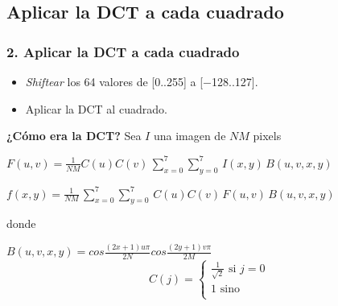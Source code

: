 \documentclass{beamer}
\begin{document}
\subsection{Aplicar la DCT a cada cuadrado}
\begin{frame}
    \frametitle{2. Aplicar la DCT a cada cuadrado}
    \begin{itemize}
        \item \textit{Shiftear} los 64 valores de [0..255] a [$-$128..127].
        \item Aplicar la DCT al cuadrado.
    \end{itemize}

\end{frame}

\begin{frame}
    \begin{center}
        \textbf{¿Cómo era la DCT?} Sea $I$ una imagen de $NM$ pixels
        \vspace{1cm}

        $F(u,v)=\frac{1}{NM}C(u)C(v)\,\sum_{x=0}^{7} \sum_{y=0}^{7}\,I(x,y)\,B(u,v,x,y)$

        \vspace{3mm}
        $f(x,y)=\frac{1}{NM}\,\sum_{x=0}^{7} \sum_{y=0}^{7}\,C(u)C(v)\,F(u,v)\,B(u,v,x,y)$

        \vspace{3mm}
        donde
        \vspace{3mm}

        $B(u,v,x,y) = cos\frac{(2x+1)u\pi}{2N}cos\frac{(2y+1)v\pi}{2M}$
        \[
        C(j) =
             \begin{cases}
                 \frac{1}{\sqrt{2}}\text{ si $j=0$}\\
                 1 \text{ sino}\\
             \end{cases}
        \]
    \end{center}
\end{frame}
\end{document}
